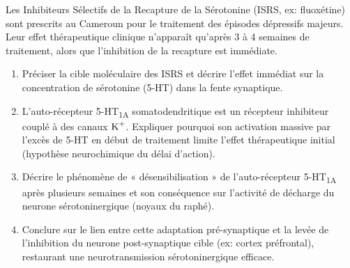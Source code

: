 \documentclass[11pt]{article}
\begin{document}
\begin{exercice}
Les Inhibiteurs Sélectifs de la Recapture de la Sérotonine (ISRS, ex: fluoxétine) sont prescrits au Cameroun pour le traitement des épisodes dépressifs majeurs. Leur effet thérapeutique clinique n'apparaît qu'après 3 à 4 semaines de traitement, alors que l'inhibition de la recapture est immédiate.

\begin{enumerate}
    \item Préciser la cible moléculaire des ISRS et décrire l'effet immédiat sur la concentration de sérotonine (5-HT) dans la fente synaptique.
    \item L'auto-récepteur 5-HT\textsubscript{1A} somatodendritique est un récepteur inhibiteur couplé à des canaux $\ce{K+}$. Expliquer pourquoi son activation massive par l'excès de 5-HT en début de traitement limite l'effet thérapeutique initial (hypothèse neurochimique du délai d'action).
    \item Décrire le phénomène de « désensibilisation » de l'auto-récepteur 5-HT\textsubscript{1A} après plusieurs semaines et son conséquence sur l'activité de décharge du neurone sérotoninergique (noyaux du raphé).
    \item Conclure sur le lien entre cette adaptation pré-synaptique et la levée de l'inhibition du neurone post-synaptique cible (ex: cortex préfrontal), restaurant une neurotransmission sérotoninergique efficace.
\end{enumerate}
\end{exercice}
\end{document}
